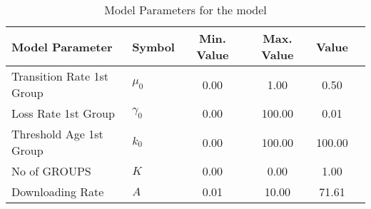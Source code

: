 \begin{table}
\centering
\begin{tabular}{p{5cm}lcccc}
{\bf Model Parameter} & {\bf Symbol} & {\bf Min. Value} & {\bf Max. Value} & {\bf Value}\\
\hline\hline
Transition Rate 1st Group & $\mu_0$ & 0.00 & 1.00 & 0.50\\
Loss Rate 1st Group & $\gamma_0$ & 0.00 & 100.00 & 0.01\\
Threshold Age 1st Group & $k_0$ & 0.00 & 100.00 & 100.00\\
No of GROUPS & $K$ & 0.00 & 0.00 & 1.00\\
Downloading Rate & $A$ & 0.01 & 10.00 & 71.61\\
\hline\hline
\end{tabular}
\caption{Model Parameters for the model}
\end{table}
